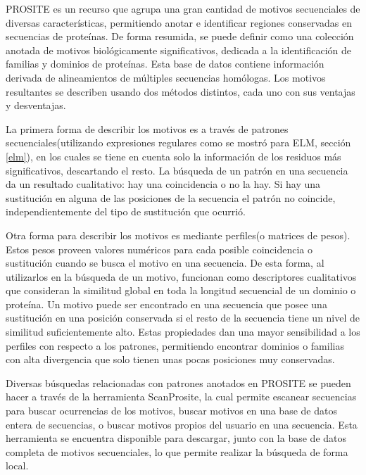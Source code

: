 PROSITE\cite{sigrist2002prosite,prositeWeb} es un recurso que agrupa una gran cantidad de motivos secuenciales de diversas características,
permitiendo anotar e identificar regiones conservadas en secuencias de proteínas.
De forma resumida, se puede definir como una colección anotada de motivos biológicamente significativos, dedicada a la identificación de familias y dominios de proteínas.
Esta base de datos contiene información derivada de alineamientos de múltiples secuencias homólogas. 
Los motivos resultantes se describen usando dos métodos distintos, cada uno con sus ventajas y desventajas.

La primera forma de describir los motivos es a través de patrones secuenciales(utilizando expresiones regulares como se mostró para ELM, sección \ref{elm}),
en los cuales se tiene en cuenta solo la información de los residuos más significativos, descartando el resto. 
La búsqueda de un patrón en una secuencia da un resultado cualitativo: hay una coincidencia o no la hay. 
Si hay una sustitución en alguna de las posiciones de la secuencia el patrón no coincide, independientemente del tipo de sustitución que ocurrió.

Otra forma para describir los motivos es mediante perfiles(o matrices de pesos). Estos pesos proveen valores numéricos para cada posible coincidencia o sustitución cuando se busca el motivo en una secuencia. 
De esta forma, al utilizarlos en la búsqueda de un motivo, funcionan como descriptores cualitativos que consideran la similitud global en toda la longitud secuencial de un dominio o proteína. 
Un motivo puede ser encontrado en una secuencia que posee una sustitución en una posición conservada si el resto de la secuencia tiene un nivel de similitud suficientemente alto.
Estas propiedades dan una mayor sensibilidad a los perfiles con respecto a los patrones, permitiendo encontrar dominios o familias con alta divergencia que solo tienen unas pocas posiciones muy conservadas.

Diversas búsquedas relacionadas con patrones anotados en PROSITE se pueden hacer a través de la herramienta ScanProsite\cite{de2006scanprosite,scanprositeWeb}, 
la cual permite escanear secuencias para buscar ocurrencias de los motivos, buscar motivos en una base de datos entera de secuencias, o buscar motivos propios del usuario en una secuencia.
Esta herramienta se encuentra disponible para descargar, junto con la base de datos completa de motivos secuenciales, lo que permite realizar la búsqueda de forma local.

